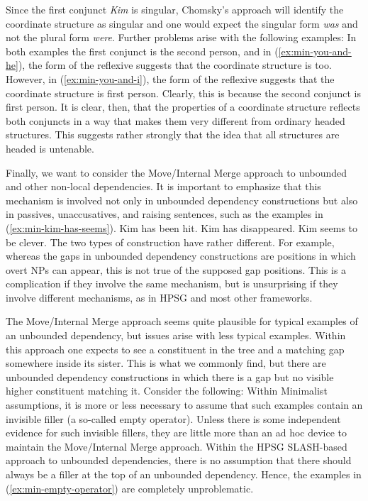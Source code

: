 \documentclass[output=paper]{langsci/langscibook}
\begin{document}
\label{ex:min-kim-lee-late}
\z
Since the first conjunct \textit{Kim} is singular, Chomsky's approach will identify the coordinate structure as singular and one would expect the singular form \textit{was} and not the plural form \textit{were}. Further problems arise with the following examples:
\eal
{}\label{ex:min-you-and-he}
\label{ex:min-you-and-i}
\zl 
In both examples the first conjunct is the second person, and in (\ref{ex:min-you-and-he}), the form of the reflexive suggests that the coordinate structure is too. However, in (\ref{ex:min-you-and-i}), the form of the reflexive suggests that the coordinate structure is first person. Clearly, this is because the second conjunct is first person. It is clear, then, that the properties of a coordinate structure reflects both conjuncts in a way that makes them very different from ordinary headed structures. This suggests rather strongly that the idea that all structures are headed is untenable.

Finally, we want to consider the Move/Internal Merge approach to unbounded and other non-local dependencies. It is important to emphasize that this mechanism is involved not only in unbounded dependency constructions but also in passives, unaccusatives, and raising sentences, such as the examples in (\ref{ex:min-kim-has-seems}).
\eal\label{ex:min-kim-has-seems}
\ex Kim has been hit.
\ex Kim has disappeared.
\ex Kim seems to be clever.
\zl
The two types of construction have rather different. For example, whereas the gaps in unbounded dependency constructions are positions in which overt NPs can appear, this is not true of the supposed gap positions.
\eal
{}
\zl 
This is a complication if they involve the same mechanism, but is unsurprising if they involve different mechanisms, as in HPSG and most other frameworks.

The Move/Internal Merge approach seems quite plausible for typical examples of an unbounded dependency, but issues arise with less typical examples. Within this approach one expects to see a constituent in the tree and a matching gap somewhere inside its sister. This is what we commonly find, but there are unbounded dependency constructions in which there is a gap but no visible higher constituent matching it. Consider \eg the following:
\eal\label{ex:min-empty-operator}
\zl 
Within Minimalist assumptions, it is more or less necessary to assume that such examples contain an invisible filler (a so-called empty operator). Unless there is some independent evidence for such invisible fillers, they are little more than an ad hoc device to maintain the Move/Internal Merge approach. Within the HPSG SLASH-based approach to unbounded dependencies, there is no assumption that there should always be a filler at the top of an unbounded dependency. Hence, the examples in (\ref{ex:min-empty-operator}) are completely unproblematic.
\end{document}
